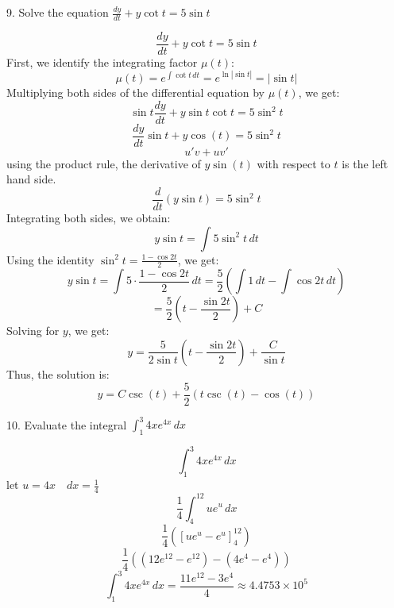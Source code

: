 \documentclass[a4paper, 12pt]{report}
\def\ni{green!60!black!40!white}
\begin{document}
    \newpage
    
    \begin{tcolorbox}[title={\color{black}\section{Q9}}, colback=white, colframe=\ni, boxrule=1mm, width=1\textwidth]
        9. Solve the equation \( \frac{dy}{dt} + y \cot t = 5 \sin t \)
    \end{tcolorbox}
    
    \[\frac{dy}{dt} + y \cot t = 5 \sin t\]
    First, we identify the integrating factor \( \mu(t) \):
    \[\mu(t) = e^{\int \cot t \, dt} = e^{\ln |\sin t|} = |\sin t|\]
    Multiplying both sides of the differential equation by \( \mu(t) \), we get:
    \[\sin t \frac{dy}{dt} + y \sin t \cot t = 5 \sin^2 t\]
    \[\frac{dy}{dt} \sin t  + y\cos(t) = 5 \sin^2 t\]
    \[u'v+uv'\]
    using the product rule, the derivative of $y\sin(t)$ with respect to $t$ is the left hand side.
    \[\frac{d}{dt} (y \sin t) = 5 \sin^2 t\]
    Integrating both sides, we obtain:
    \[y \sin t = \int 5 \sin^2 t \, dt\]
    Using the identity \( \sin^2 t = \frac{1 - \cos 2t}{2} \), we get:
    \[y \sin t = \int 5 \cdot \frac{1 - \cos 2t}{2} \, dt = \frac{5}{2} \left( \int 1 \, dt - \int \cos 2t \, dt \right)\]
    \[= \frac{5}{2} \left( t - \frac{\sin 2t}{2} \right) + C\]
    Solving for \( y \), we get:
    \[y = \frac{5}{2 \sin t} \left( t - \frac{\sin 2t}{2} \right) + \frac{C}{\sin t}\]
    Thus, the solution is:
    \[\boxed{y = C \csc(t) + \frac{5}{2} (t\csc(t)-\cos(t))}\]

    
    \newpage
    
    \begin{tcolorbox}[title={\color{black}\section{Q10}}, colback=white, colframe=\ni, boxrule=1mm, width=1\textwidth]
        10. Evaluate the integral \( \int_{1}^{3} 4x e^{4x} \, dx \)
    \end{tcolorbox}
       
    \[\int_{1}^{3} 4x e^{4x} \, dx\]
    let \(u=4x \quad dx=\frac{1}{4}\)
    \[\frac{1}{4}\int_{4}^{12} u e^{u} \, dx\]
    \[\frac{1}{4} \left([u e^{u}-e^{u}]_{4}^{12}\right)\]
    \[\frac{1}{4} \left(\left(12 e^{12}-e^{12}\right)-\left(4 e^{4}-e^{4}\right)\right)\]
    \[\boxed{\int_{1}^{3} 4x e^{4x} \, dx=\frac{11e^{12}-3e^{4}}{4} \approx 4.4753\times10^5}\]
\end{document}
